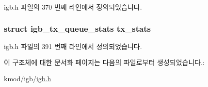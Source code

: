 igb.\+h 파일의 370 번째 라인에서 정의되었습니다.

\subsubsection[{\texorpdfstring{tx\+\_\+stats}{tx_stats}}]{\setlength{\rightskip}{0pt plus 5cm}struct {\bf igb\+\_\+tx\+\_\+queue\+\_\+stats} tx\+\_\+stats}\hypertarget{structigb__ring_a792fc082f8347a1d1aaa623bbc35ed10}{}\label{structigb__ring_a792fc082f8347a1d1aaa623bbc35ed10}


igb.\+h 파일의 391 번째 라인에서 정의되었습니다.



이 구조체에 대한 문서화 페이지는 다음의 파일로부터 생성되었습니다.\+:\begin{DoxyCompactItemize}
\item 
kmod/igb/\hyperlink{kmod_2igb_2igb_8h}{igb.\+h}\end{DoxyCompactItemize}
